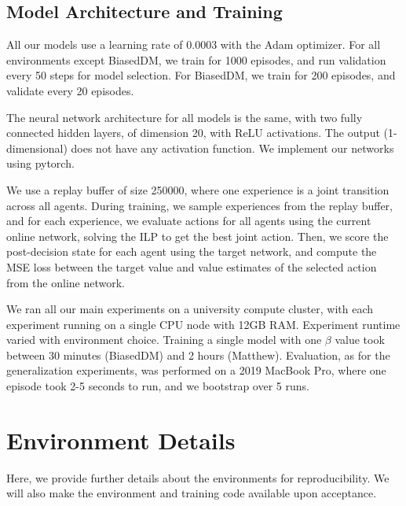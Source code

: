 \subsection{Model Architecture and Training}
All our models use a learning rate of 0.0003 with the Adam optimizer. For all environments except BiasedDM, we train for 1000 episodes, and run validation every 50 steps for model selection. For BiasedDM, we train for 200 episodes, and validate every 20 episodes.

The neural network architecture for all models is the same, with two fully connected hidden layers, of dimension 20, with ReLU activations. The output (1-dimensional) does not have any activation function. We implement our networks using pytorch. 

We use a replay buffer of size 250000, where one experience is a joint transition across all agents. During training, we sample experiences from the replay buffer, and for each experience, we evaluate actions for all agents using the current online network, solving the ILP to get the best joint action. Then, we score the post-decision state for each agent using the target network, and compute the MSE loss between the target value and value estimates of the selected action from the online network.

We ran all our main experiments on a university compute cluster, with each experiment running on a single CPU node with 12GB RAM. Experiment runtime varied with environment choice. Training a single model with one $\beta$ value took between 30 minutes (BiasedDM) and 2 hours (Matthew). Evaluation, as for the generalization experiments, was performed on a 2019 MacBook Pro, where one episode took 2-5 seconds to run, and we bootstrap over 5 runs. 

\section{Environment Details}
\label{sec:appendix1}
Here, we provide further details about the environments for reproducibility. We will also make the environment and training code available upon acceptance.

